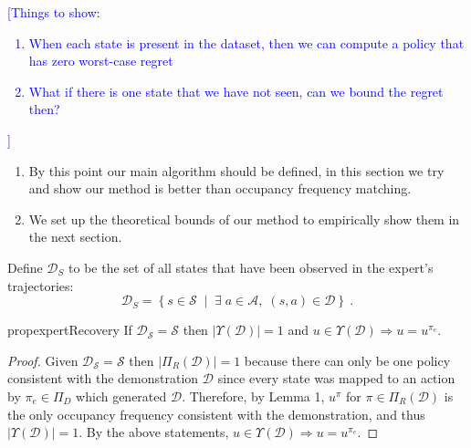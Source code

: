 \documentclass[11pt]{uai2023}
\newcommand{\mm}[1]{\textcolor{blue}{[#1]}}
\begin{document}
\mm{Things to show:
	\begin{enumerate}
		\item When each state is present in the dataset, then we can compute a policy that has zero worst-case regret
		\item What if there is one state that we have not seen, can we bound the regret then?
	\end{enumerate}
}

\begin{enumerate}
	\item By this point our main algorithm should be defined, in this section we
	      try and show our method is better than occupancy frequency matching.
	\item We set up the theoretical bounds of our method to empirically show them
	      in the next section.
\end{enumerate}

Define $\mathcal{D}_S$ to be the set of all states that have been observed in the expert's trajectories:
\[
	\mathcal{D}_S  = \left\{ s\in \mathcal{S} \; \mid \; \exists\; a\in \mathcal{A}, \; (s,a) \in \mathcal{D} \right\}~.
\]



\begin{restatable}{prop}{expertRecovery}
    \label{expert_recovery}
    If $\mathcal{D}_\mathcal{S} = \mathcal{S}$ then $|\Upsilon(\mathcal{D})| = 1$
    and $u \in \Upsilon(\mathcal{D}) \Rightarrow u = u^{\pi_e}$.
\end{restatable}

\begin{proof}
	Given $\mathcal{D}_\mathcal{S} = \mathcal{S}$ then $|\Pi_R(\mathcal{D})| = 1$
	because there can only be one policy consistent with the demonstration
	$\mathcal{D}$ since every state was mapped to an action by $\pi_e \in \Pi_D$
	which generated $\mathcal{D}$. Therefore, by Lemma 1, $u^\pi$ for $\pi \in
		\Pi_R(\mathcal{D})$ is the only occupancy frequency consistent with the
	demonstration, and thus $|\Upsilon(\mathcal{D})| = 1$. By the above
	statements, $u \in \Upsilon(\mathcal{D}) \Rightarrow u = u^{\pi_e}$.
\end{proof}
\end{document}
